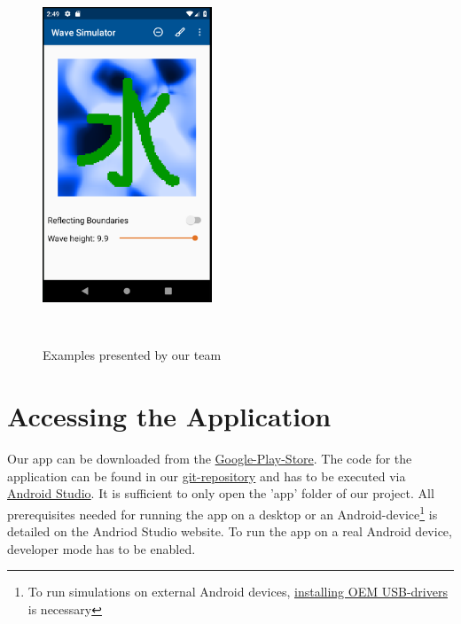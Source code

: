 \documentclass[11pt,a4paper]{article}
\begin{document}
\begin{figure}[H]
{\hfill    
\includegraphics[width=0.45\textwidth , height = 10.5cm]{Mizu.png}%
}
\caption{Examples presented by our team}
\end{figure}

\pagebreak
\section{Accessing the Application}
Our app can be downloaded from the \href{https://play.google.com/store/apps/details?id=gregor.wavesimulator}{Google-Play-Store}.
The code for the application can be found in our \href{https://gitlab.lrz.de/ga84niv/WaveSimulator.git}{git-repository} and has to be executed via \href{https://developer.android.com/studio/}{Android Studio}. It is sufficient to only open the 'app' folder of our project. All prerequisites needed for running the app on a desktop or an Android-device\footnote{To run simulations on external Android devices, \href{https://developer.android.com/studio/run/oem-usb}{installing OEM USB-drivers} is necessary} is detailed on the Andriod Studio website. To run the app on a real Android device, developer mode has to be enabled. 
\end{document}

